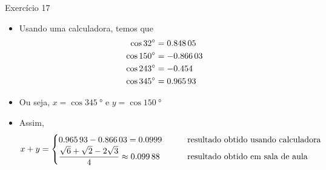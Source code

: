 \newcommand{\bob}[1]{\pgfmathparse{#1}\num{\pgfmathresult}}

\begin{frame}{Exercício 17}
    \begin{itemize}
        \item Usando uma calculadora, temos que
            \begin{align*}
                \cos{\SI{32}{\degree}} &= \bob{cos(32)}\\
                \cos{\SI{150}{\degree}} &= \bob{cos(150)}\\
                \cos{\SI{243}{\degree}} &= \bob{cos(243)}\\
                \cos{\SI{345}{\degree}} &= \bob{cos(345)}
            \end{align*}
        \item Ou seja, \(x=\cos{\SI{345}{\degree}}\) e \(y=\cos{\SI{150}{\degree}}\)
        \item Assim, 
            \[
                x+y=
                \begin{cases}
                    \bob{cos(345)}-\bob{-cos(150)} = \bob{cos(345)+cos(150)} \qquad &\text{resultado obtido usando calculadora}\\
                    \dfrac{\sqrt{6}+\sqrt{2}-2\sqrt{3}}{4} \approx \bob{(sqrt(6)+sqrt(2)-2*sqrt(3))/4} \qquad &\text{resultado obtido em sala de aula}
                \end{cases}
            \]
    \end{itemize}
\end{frame}
